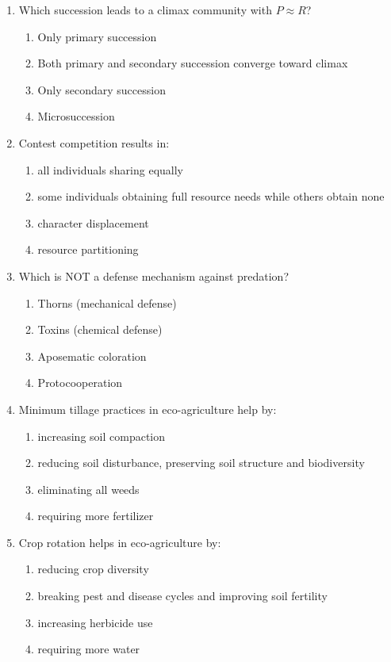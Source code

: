 \documentclass[11pt]{article}
\begin{document}
\begin{enumerate}[label=\textbf{\arabic*.}]
\clearpage

\item Which succession leads to a climax community with $P \approx R$?
\begin{enumerate}[label=\Alph*.]
  \item Only primary succession
  \item Both primary and secondary succession converge toward climax
  \item Only secondary succession
  \item Microsuccession
\end{enumerate}

\item Contest competition results in:
\begin{enumerate}[label=\Alph*.]
  \item all individuals sharing equally
  \item some individuals obtaining full resource needs while others obtain none
  \item character displacement
  \item resource partitioning
\end{enumerate}

\item Which is NOT a defense mechanism against predation?
\begin{enumerate}[label=\Alph*.]
  \item Thorns (mechanical defense)
  \item Toxins (chemical defense)
  \item Aposematic coloration
  \item Protocooperation
\end{enumerate}

\item Minimum tillage practices in eco-agriculture help by:
\begin{enumerate}[label=\Alph*.]
  \item increasing soil compaction
  \item reducing soil disturbance, preserving soil structure and biodiversity
  \item eliminating all weeds
  \item requiring more fertilizer
\end{enumerate}

\item Crop rotation helps in eco-agriculture by:
\begin{enumerate}[label=\Alph*.]
  \item reducing crop diversity
  \item breaking pest and disease cycles and improving soil fertility
  \item increasing herbicide use
  \item requiring more water
\end{enumerate}


\end{enumerate}
\end{document}
